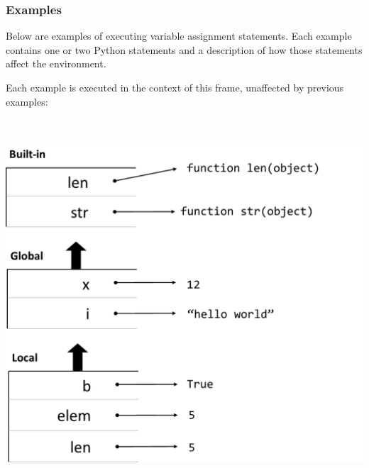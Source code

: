 \documentclass{article}
\newcommand{\pretabularspace}{\ifhevea\else \strut \\ \strut \fi}
\newcommand{\posttabularspace}{\ifhevea\else \strut \\ \strut \fi}
\begin{document}
\subsubsection{Examples}

Below are examples of executing variable assignment statements. Each example contains one or two Python statements and a description of how those statements affect the environment.

Each example is executed in the context of this frame, unaffected by previous examples:

  \pretabularspace
  \includegraphics{diagrams/environment-1}
  \posttabularspace

\end{document}

